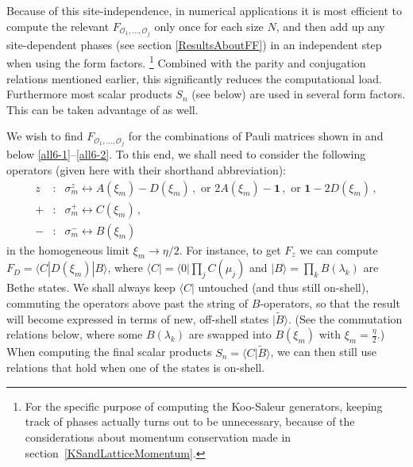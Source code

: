 \documentclass[a4paper,10pt]{article}
\newcommand{\linnea}[1]{$\framebox{\tiny L}$\ \textbf{\texttt{{\color{red}\footnotesize#1}}}}
\begin{document}
Because of this site-independence, in numerical applications it is most efficient to compute the relevant $F_{\mathcal{O}_1,\ldots,\mathcal{O}_j}$ only once for each size $N$, and then add up any site-dependent phases (see section \ref{ResultsAboutFF}) in an independent step when using the form factors.%
\footnote{For the specific purpose of computing the Koo-Saleur generators, keeping track of phases actually turns out to be unnecessary, because of the considerations about momentum conservation made in section~\ref{KSandLatticeMomentum}.}
Combined with the parity and conjugation relations mentioned earlier, this significantly reduces the computational load. Furthermore most scalar products $S_n$ (see below) are used in several form factors. This can be taken advantage of as well.





We wish to find $F_{\mathcal{O}_1,\ldots,\mathcal{O}_j}$ for the combinations of Pauli matrices shown in and below \eqref{all6-1}--\eqref{all6-2}. To this end, we shall need to consider the following operators (given here with their shorthand abbreviation): 
\begin{subequations}
\label{operator_correspondence}
\begin{eqnarray}
z &:& \sigma_m^z \leftrightarrow A(\xi_m) - D(\xi_m) \,, \text{ or } 2A(\xi_m)-\mathbf{1} \,, \text{ or }\mathbf{1}-2D(\xi_m) \,, \\
+ &:& \sigma_m^{+} \leftrightarrow C(\xi_m) \,, \\
- &:& \sigma_m^{-} \leftrightarrow B(\xi_m)
\end{eqnarray}
\end{subequations}
in the homogeneous limit $\xi_m \rightarrow \eta/2$. For instance, to get $F_z$ we can compute $F_D=\langle C |D(\xi_m)| B\rangle$, where $\langle C| = \langle 0 | \prod_j C(\mu_j)$ and $|B\rangle=\prod_k B(\lambda_k)$ are Bethe states. We shall always keep $\langle C|$ untouched (and thus still on-shell), commuting the operators above past the string of $B$-operators, so that the result will become expressed in terms of new, off-shell states $|\tilde{B}\rangle$. (See the commutation relations below, where some $B(\lambda_k)$ are swapped into $B\left( \xi_m \right)$ with $\xi_m = \frac{\eta}{2}$.) When computing the final scalar products $S_n=\langle C|\tilde{B}\rangle$, we can then still use relations that hold when one of the states is on-shell.
\end{document}
